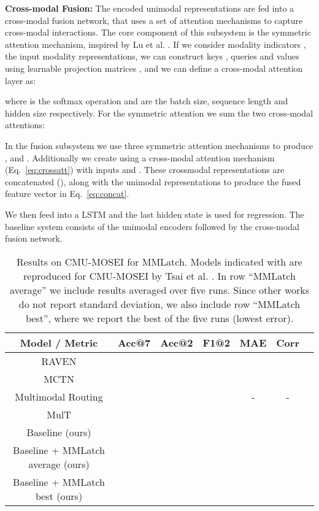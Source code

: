 \documentclass{article}
\begin{document}
\noindent\textbf{Cross-modal Fusion:}
The encoded unimodal representations are fed into a cross-modal fusion network, that uses a set of attention mechanisms to capture cross-modal interactions.
The core component of this subsystem is the symmetric attention mechanism, inspired by Lu et al. \cite{vilbert2019}.
If we consider modality indicators ,  the input modality representations, we can construct keys , queries  and values  using  learnable projection matrices , and we can define a cross-modal attention layer as:






\noindent where  is the softmax operation and  are the batch size, sequence length and hidden size respectively.
For the symmetric attention we sum the two cross-modal attentions:





In the fusion subsystem we use three symmetric attention mechanisms to produce ,  and . 
Additionally we create  using a cross-modal attention mechanism (Eq.~\eqref{eq:crossatt}) with inputs  and . 
These crossmodal representations are concatenated (), along with the unimodal representations  to produce the fused feature vector  in Eq.~\eqref{eq:concat}.



We then feed  into a LSTM and the last hidden state is used for regression.
The baseline system consists of the unimodal encoders followed by the cross-modal fusion network.


\begin{table*}[h]
    \centering
    \small
    \begin{tabular}{|c|c|c|c|c|c|c|}
      \hline
       Model / Metric & Acc@7  & Acc@2 & F1@2  & MAE & Corr \\\hline\hline
       RAVEN \cite{wang2019words}  &  &   &  &  &  \\
MCTN \cite{pham2019found}  &  &   &  &  &  \\
Multimodal Routing \cite{tsai-etal-2020-multimodal} &  &   &  & - & - \\
MulT \cite{tsai-etal-2019-multimodal} &  &   &  &  &  \\ \hline
Baseline (ours) &  &  &  &  &  \\
Baseline + MMLatch average (ours) &  &  &  &  & \\
Baseline + MMLatch best (ours) &  &  &   &  &  \\  \hline
    \end{tabular}
    \caption{Results on CMU-MOSEI for MMLatch. Models indicated with  are reproduced for CMU-MOSEI by Tsai et al. \cite{tsai-etal-2019-multimodal}. In row ``MMLatch average'' we include  results averaged over five runs. Since other works do not report standard deviation, we also include row ``MMLatch best'', where we report the best of the five runs (lowest error).}
    \label{tab:my_label}
\end{table*}
\end{document}
